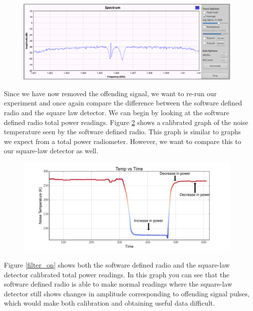 {\begin{figure}[h!tb] \centering
\includegraphics[width=\textwidth]{Images/spectrum_filter.png}
\label{spectrum_filter}
\end{figure}

Since we have now removed the offending signal, we want to re-run our experiment and once again compare the difference between the software defined radio and the square law detector. We can begin by looking at the software defined radio total power readings.  Figure \ref{sdr_calib_filter} shows a calibrated graph of the noise temperature seen by the software defined radio.  This graph is similar to graphs we expect from a total power radiometer.  However, we want to compare this to our square-law detector as well.  

\begin{figure}[h!tb] \centering
\includegraphics[width=\textwidth]{Experiments/Exp4/calib_filtered.pdf}
\label{sdr_calib_filter}
\end{figure}

Figure \ref{filter_on} shows both the software defined radio and the square-law detector calibrated total power readings.  In this graph you can see that the software defined radio is able to make normal readings where the square-law detector still shows changes in amplitude corresponding to offending signal pulses, which would make both calibration and obtaining useful data difficult.

}

